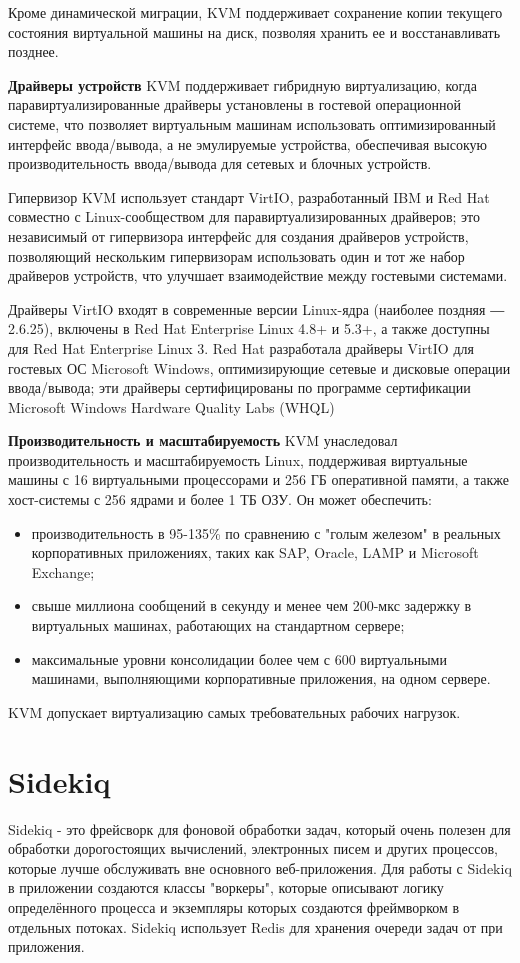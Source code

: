 Кроме динамической миграции, KVM поддерживает сохранение копии текущего состояния виртуальной машины на диск, позволяя хранить ее и восстанавливать позднее.

\textbf{Драйверы устройств}
KVM поддерживает гибридную виртуализацию, когда паравиртуализированные драйверы установлены в гостевой операционной системе, что позволяет виртуальным машинам использовать оптимизированный интерфейс ввода/вывода, а не эмулируемые устройства, обеспечивая высокую производительность ввода/вывода для сетевых и блочных устройств.

Гипервизор KVM использует стандарт VirtIO, разработанный IBM и Red Hat совместно с Linux-сообществом для паравиртуализированных драйверов; это независимый от гипервизора интерфейс для создания драйверов устройств, позволяющий нескольким гипервизорам использовать один и тот же набор драйверов устройств, что улучшает взаимодействие между гостевыми системами.

Драйверы VirtIO входят в современные версии Linux-ядра (наиболее поздняя ― 2.6.25), включены в Red Hat Enterprise Linux 4.8+ и 5.3+, а также доступны для Red Hat Enterprise Linux 3. Red Hat разработала драйверы VirtIO для гостевых ОС Microsoft Windows, оптимизирующие сетевые и дисковые операции ввода/вывода; эти драйверы сертифицированы по программе сертификации Microsoft Windows Hardware Quality Labs (WHQL)

\textbf{Производительность и масштабируемость}
KVM унаследовал производительность и масштабируемость Linux, поддерживая виртуальные машины с 16 виртуальными процессорами и 256 ГБ оперативной памяти, а также хост-системы с 256 ядрами и более 1 ТБ ОЗУ. Он может обеспечить:

\begin{itemize}
  \item производительность в 95-135\% по сравнению с "голым железом" в реальных корпоративных приложениях, таких как SAP, Oracle, LAMP и Microsoft Exchange;
  \item свыше миллиона сообщений в секунду и менее чем 200-мкс задержку в виртуальных машинах, работающих на стандартном сервере;
  \item максимальные уровни консолидации более чем с 600 виртуальными машинами, выполняющими корпоративные приложения, на одном сервере.
\end{itemize}

KVM допускает виртуализацию самых требовательных рабочих нагрузок.

\section{Sidekiq}\label{sec:ch3/sect5}
Sidekiq - это фрейсворк для фоновой обработки задач, который очень полезен для обработки дорогостоящих вычислений, электронных писем и других процессов, которые лучше обслуживать вне основного веб-приложения.
Для работы с Sidekiq в приложении создаются классы "воркеры", которые описывают логику определённого процесса и экземпляры которых создаются фреймворком в отдельных потоках.
Sidekiq использует Redis для хранения очереди задач от при приложения.
  
